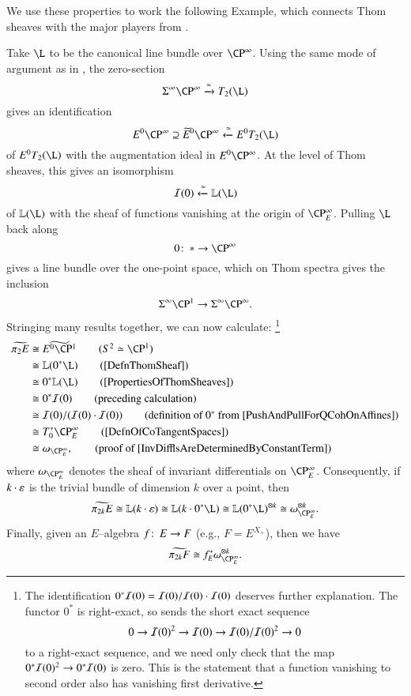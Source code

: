 We use these properties to work the following Example, which connects Thom sheaves with the major players from .

\begin{example}\label{Pi2AndInvariantDiffls}
Take $\L$ to be the canonical line bundle over $\CP^\infty$.  Using the same mode of argument as in , the zero-section \[\Susp^\infty \CP^\infty \xrightarrow{\simeq} T_2(\L)\] gives an identification \[E^0 \CP^\infty \supseteq \widetilde E^0 \CP^\infty \xleftarrow{\simeq} E^0 T_2(\L)\] of $E^0 T_2(\L)$ with the augmentation ideal in $E^0 \CP^\infty$.  At the level of Thom sheaves, this gives an isomorphism \[\sheaf I(0) \xleftarrow{\simeq} \ThomSheaf{\L}\] of $\ThomSheaf{\L}$ with the sheaf of functions vanishing at the origin of $\CP^\infty_E$.  Pulling $\L$ back along \[0\co * \to \CP^\infty\] gives a line bundle over the one-point space, which on Thom spectra gives the inclusion \[\Susp^\infty \CP^1 \to \Susp^\infty \CP^\infty.\]  Stringing many results together, we can now calculate:%
\footnote{The identification $0^* \mathcal{I}(0) = \mathcal{I}(0) / \mathcal{I}(0) \cdot \mathcal{I}(0)$ deserves further explanation.  The functor $0^*$ is right-exact, so sends the short exact sequence \[0 \to \mathcal{I}(0)^2 \to \mathcal{I}(0) \to \mathcal{I}(0) / \mathcal{I}(0)^2 \to 0\] to a right-exact sequence, and we need only check that the map $0^* \mathcal{I}(0)^2 \to 0^* \mathcal{I}(0)$ is zero.  This is the statement that a function vanishing to second order also has vanishing first derivative.}
\begin{align*}
\widetilde{\pi_2 E} & \cong \widetilde{E^0 \CP^1} \tag{$S^2 \simeq \CP^1$} \\
& \cong \ThomSheaf{0^* \L} \tag{\Cref{DefnThomSheaf}} \\
& \cong 0^* \ThomSheaf{\L} \tag{\Cref{PropertiesOfThomSheaves}} \\
& \cong 0^* \sheaf I(0) \tag{preceding calculation} \\
& \cong \sheaf I(0) / (\sheaf I(0) \cdot \sheaf I(0)) \tag{definition of $0^*$ from \Cref{PushAndPullForQCohOnAffines}} \\
& \cong T^*_0 \CP^\infty_E \tag{\Cref{DefnOfCoTangentSpaces}} \\
& \cong \omega_{\CP^\infty_E}, \tag{proof of \Cref{InvDifflsAreDeterminedByConstantTerm}}
\end{align*}
where $\omega_{\CP^\infty_E}$ denotes the sheaf of invariant differentials on $\CP^\infty_E$.  Consequently, if $k \cdot \varepsilon$ is the trivial bundle of dimension $k$ over a point, then \[\widetilde{\pi_{2k} E} \cong \ThomSheaf{k \cdot \eps} \cong \ThomSheaf{k \cdot 0^* \L} \cong \ThomSheaf{0^* \L}^{\otimes k} \cong \omega_{\CP^\infty_E}^{\otimes k}.\]  Finally, given an $E$--algebra $f \colon\thinspace E \to F$ (e.g., $F = E^{X_+}$), then we have \[\widetilde{\pi_{2k} F} \cong f_E^* \omega_{\CP^\infty_E}^{\otimes k}.\]
\end{example}

